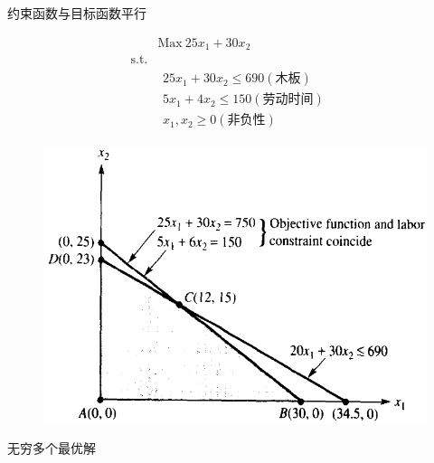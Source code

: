 \documentclass[UTF8]{ctexbeamer}
\begin{document}
\begin{frame}{约束函数与目标函数平行}
  \begin{figure}
    \begin{minipage}{.5\linewidth}
      \[ 
      \begin{array}{lcl}
        & \mbox{Max}\ 25x_1 + 30x_2 & \\
        \mbox{s.t.} & &  \\
        &
        \begin{array}{c}
          25x_1 + 30x_2 \le 690 (\text{木板})\\
          5x_1 + 4x_2 \le 150 (\text{劳动时间})\\
          x_1, x_2 \ge 0 (\text{非负性})
        \end{array}
        &
      \end{array}
      \]
    \end{minipage}%
    \begin{minipage}{.5\linewidth}
      \includegraphics[width=\textwidth{}]{coincide.png}
    \end{minipage}
  \end{figure}

  无穷多个最优解

\end{frame}
\end{document}

